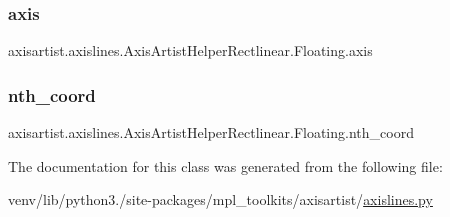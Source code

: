 \subsubsection{\texorpdfstring{axis}{axis}}
{\footnotesize\ttfamily axisartist.\+axislines.\+Axis\+Artist\+Helper\+Rectlinear.\+Floating.\+axis}

\mbox{\label{classaxisartist_1_1axislines_1_1AxisArtistHelperRectlinear_1_1Floating_a04846c1f472b2f1b06741624411c4dbb}} 
\subsubsection{\texorpdfstring{nth\+\_\+coord}{nth\_coord}}
{\footnotesize\ttfamily axisartist.\+axislines.\+Axis\+Artist\+Helper\+Rectlinear.\+Floating.\+nth\+\_\+coord}



The documentation for this class was generated from the following file\+:\begin{DoxyCompactItemize}
\item 
venv/lib/python3./site-\/packages/mpl\+\_\+toolkits/axisartist/\hyperlink{axisartist_2axislines_8py}{axislines.\+py}\end{DoxyCompactItemize}

